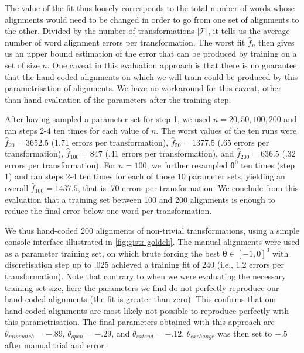 The value of the fit thus loosely corresponds to the total number of
words whose alignments would need to be changed in order to go from one
set of alignments to the other. Divided by the number of transformations
\(|\mathcal{T}|\), it tells us the average number of word alignment
errors per transformation. The worst fit \(\hat{f}_n\) then gives us an
upper bound estimation of the error that can be produced by training on
a set of size \(n\). One caveat in this evaluation approach is that
there is no guarantee that the hand-coded alignments on which we will
train could be produced by this parametrisation of alignments. We have
no workaround for this caveat, other than hand-evaluation of the
parameters after the training step.

After having sampled a parameter set for step 1, we used
\(n = 20, 50, 100, 200\) and ran steps 2-4 ten times for each value of
\(n\). The worst values of the ten runs were \(\hat{f}_{20} = 3652.5\)
(1.71 errors per transformation), \(\hat{f}_{50} = 1377.5\) (.65 errors
per transformation), \(\hat{f}_{100} = 847\) (.41 errors per
transformation), and \(\hat{f}_{200} = 636.5\) (.32 errors per
transformation). For \(n = 100\), we further resampled \(\bm{\theta}^0\)
ten times (step 1) and ran steps 2-4 ten times for each of those 10
parameter sets, yielding an overall \(\hat{f}_{100} = 1437.5\), that is
.70 errors per transformation. We conclude from this evaluation that a
training set between 100 and 200 alignments is enough to reduce the
final error below one word per transformation.

We thus hand-coded 200 alignments of non-trivial transformations, using
a simple console interface illustrated in \cref{fig:gistr-goldcli}. The
manual alignments were used as a parameter training set, on which brute
forcing the best \(\bm{\theta} \in [-1, 0]^3\) with discretisation step
up to .025 achieved a training fit of 240 (i.e., 1.2 errors per
transformation). Note that contrary to when we were evaluating the
necessary training set size, here the parameters we find do not
perfectly reproduce our hand-coded alignments (the fit is greater than
zero). This confirms that our hand-coded alignments are most likely not
possible to reproduce perfectly with this parametrisation. The final
parameters obtained with this approach are \(\theta_{mismatch} = -.89\),
\(\theta_{open} = -.29\), and \(\theta_{extend} = -.12\).
\(\theta_{exchange}\) was then set to \(-.5\) after manual trial and
error.

